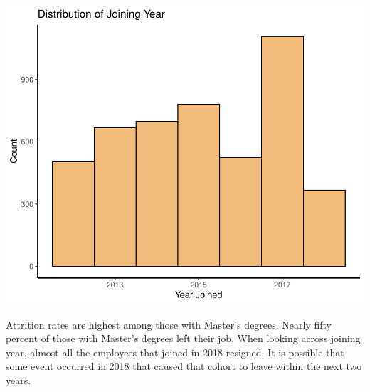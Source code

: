 \documentclass[11pt,preprint, authoryear]{elsarticle}
\numberwithin{equation}{section}
\numberwithin{figure}{section}
\numberwithin{table}{section}
\begin{document}
\includegraphics{Final_project_files/figure-latex/unnamed-chunk-3-3.pdf}

Attrition rates are highest among those with Master's degrees. Nearly
fifty percent of those with Master's degrees left their job. When
looking across joining year, almost all the employees that joined in
2018 resigned. It is possible that some event occurred in 2018 that
caused that cohort to leave within the next two years.
\end{document}

